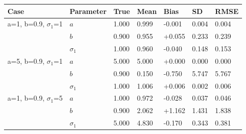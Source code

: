 \begin{tabular}{l l l l l l l}
\toprule
Case & Parameter & True & Mean & Bias & SD & RMSE \\
\midrule
a=1, b=0.9, $\sigma_1$=1 & $a$ & 1.000 & 0.999 & -0.001 & 0.004 & 0.004 \\
 & $b$ & 0.900 & 0.955 & +0.055 & 0.233 & 0.239 \\
 & $\sigma_1$ & 1.000 & 0.960 & -0.040 & 0.148 & 0.153 \\
\midrule
a=5, b=0.9, $\sigma_1$=1 & $a$ & 5.000 & 5.000 & +0.000 & 0.000 & 0.000 \\
 & $b$ & 0.900 & 0.150 & -0.750 & 5.747 & 5.767 \\
 & $\sigma_1$ & 1.000 & 1.006 & +0.006 & 0.002 & 0.006 \\
\midrule
a=1, b=0.9, $\sigma_1$=5 & $a$ & 1.000 & 0.972 & -0.028 & 0.037 & 0.046 \\
 & $b$ & 0.900 & 2.062 & +1.162 & 1.431 & 1.838 \\
 & $\sigma_1$ & 5.000 & 4.830 & -0.170 & 0.343 & 0.381 \\
\bottomrule
\end{tabular}